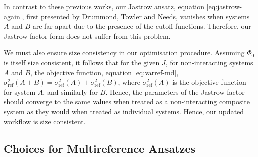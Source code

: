 In contrast to these previous works, our Jastrow ansatz, equation \ref{eq:jastrow-again}, first presented by Drummond, Towler and Needs,\supercite{drummondJastrow2004} vanishes when systems $A$ and $B$ are far apart due to the presence of the cutoff functions. Therefore, our Jastrow factor form does not suffer from this problem.

We must also ensure size consistency in our optimisation procedure. Assuming $\Phi_0$ is itself size consistent, it follows that for the given $J$, for non-interacting systems $A$ and $B$, the objective function, equation \ref{eq:varref-md}, $\sigma_\mathrm{ref}^2(A+B) = \sigma_\mathrm{ref}^2(A) + \sigma_\mathrm{ref}^2(B)$, where $\sigma_\mathrm{ref}^2(A)$ is the objective function for system $A$, and similarly for $B$. Hence, the parameters of the Jastrow factor should converge to the same values when treated as a non-interacting composite system as they would when treated as individual systems. Hence, our updated workflow is size consistent.

\subsection{Choices for Multireference Ansatzes}

